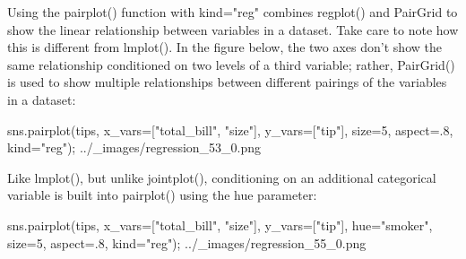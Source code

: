 \begin{frame}
Using the pairplot() function with kind="reg" combines regplot() and PairGrid to show the linear relationship between variables in a dataset. Take care to note how this is different from lmplot(). In the figure below, the two axes don’t show the same relationship conditioned on two levels of a third variable; rather, PairGrid() is used to show multiple relationships between different pairings of the variables in a dataset:

sns.pairplot(tips, x_vars=["total_bill", "size"], y_vars=["tip"],
             size=5, aspect=.8, kind="reg");
../_images/regression_53_0.png
\end{frame}
\begin{frame}
	Like lmplot(), but unlike jointplot(), conditioning on an additional categorical variable is built into pairplot() using the hue parameter:

sns.pairplot(tips, x_vars=["total_bill", "size"], y_vars=["tip"],
             hue="smoker", size=5, aspect=.8, kind="reg");
../_images/regression_55_0.png

\end{frame}

